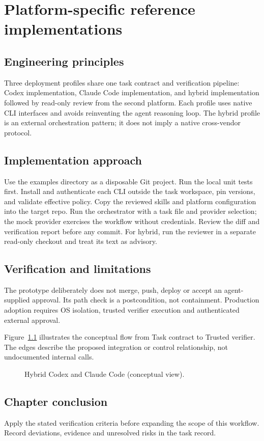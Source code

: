 \chapter{Platform-specific reference implementations}

\section{Engineering principles}

Three deployment profiles share one task contract and verification pipeline: Codex implementation, Claude Code implementation, and hybrid implementation followed by read-only review from the second platform. Each profile uses native CLI interfaces and avoids reinventing the agent reasoning loop. The hybrid profile is an external orchestration pattern; it does not imply a native cross-vendor protocol.

\section{Implementation approach}

Use the examples directory as a disposable Git project. Run the local unit tests first. Install and authenticate each CLI outside the task workspace, pin versions, and validate effective policy. Copy the reviewed skills and platform configuration into the target repo. Run the orchestrator with a task file and provider selection; the mock provider exercises the workflow without credentials. Review the diff and verification report before any commit. For hybrid, run the reviewer in a separate read-only checkout and treat its text as advisory.

\section{Verification and limitations}

The prototype deliberately does not merge, push, deploy or accept an agent-supplied approval. Its path check is a postcondition, not containment. Production adoption requires OS isolation, trusted verifier execution and authenticated external approval.

Figure~\ref{fig:d24} illustrates the conceptual flow from Task contract to Trusted verifier. The edges describe the proposed integration or control relationship, not undocumented internal calls.

\begin{figure}[htbp]\centering\caption{Hybrid Codex and Claude Code (conceptual view).}\label{fig:d24}\end{figure}

\section{Chapter conclusion}

Apply the stated verification criteria before expanding the scope of this workflow. Record deviations, evidence and unresolved risks in the task record.
